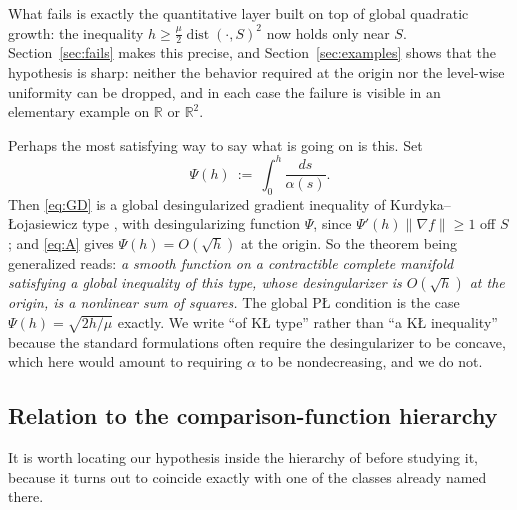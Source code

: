 \documentclass[11pt]{article}
\theoremstyle{plain}
\theoremstyle{definition}
\theoremstyle{remark}
\newcommand{\R}{\mathbb{R}}
\newcommand{\KL}{\textup{K\L}}
\DeclareMathOperator{\dist}{dist}
\begin{document}
What fails is exactly the quantitative layer built on top of global quadratic
growth: the inequality $h \ge \tfrac{\mu}{2}\dist(\cdot,S)^2$ now holds only near
$S$. Section~\ref{sec:fails}
makes this precise, and Section~\ref{sec:examples} shows that the hypothesis is
sharp: neither the behavior required at the origin nor the level-wise uniformity
can be dropped, and in each case the failure is visible in an elementary example
on $\R$ or $\R^2$.

Perhaps the most satisfying way to say what is going on is this. Set
\begin{equation}\label{eq:Psi}
  \Psi(h) \ :=\ \int_0^h \frac{ds}{\alpha(s)} .
\end{equation}
Then \eqref{eq:GD} is a global desingularized gradient inequality of
Kurdyka--\L{}ojasiewicz type \cite{Loj1982, Kurdyka1998}, with desingularizing
function $\Psi$, since $\Psi'(h)\|\nabla f\| \ge 1$ off $S$; and \eqref{eq:A}
gives $\Psi(h) = O(\sqrt h)$ at the origin. So the theorem being generalized
reads: \emph{a smooth function on a contractible complete manifold satisfying a
global inequality of this type, whose desingularizer is $O(\sqrt{h})$ at the
origin, is a nonlinear sum of squares.} The global P\L{} condition is the case
$\Psi(h)=\sqrt{2h/\mu}$ exactly. We write ``of \KL{} type'' rather than ``a \KL{}
inequality'' because the standard formulations often require the desingularizer to
be concave, which here would amount to requiring $\alpha$ to be nondecreasing, and
we do not.

\subsection{Relation to the comparison-function hierarchy}
\label{sec:hierarchy}

It is worth locating our hypothesis inside the hierarchy of
\cite{Sontag2025L4DC} before studying it, because it
turns out to coincide exactly with one of the classes already named there.
\end{document}

